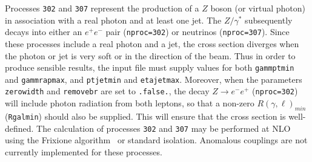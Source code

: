 \label{subsec:zgammajet}
Processes {\tt 302} and {\tt 307} represent the production of a $Z$ boson (or virtual photon)
in association with a real photon and at least one jet.
The $Z/\gamma^*$ subsequently decays into
either an $e^+ e^-$ pair ({\tt nproc=302}) or neutrinos ({\tt nproc=307}).
Since these processes include a real photon and a jet, the cross section diverges
when the photon or jet is very soft or in the direction of the beam.
Thus in order to produce sensible results, the input file must supply values for both
{\tt gammptmin} and {\tt gammrapmax}, and {\tt ptjetmin} and {\tt etajetmax}.
 Moreover, when the parameters {\tt zerowidth}
and {\tt removebr} are set to {\tt .false.}, the decay $Z \to e^- e^+$ ({\tt nproc=302})
will include photon radiation from both leptons, so that a non-zero $R(\gamma,\ell)_{min}$
({\tt Rgalmin})
should also be supplied. This will ensure that the cross section is well-defined.
The calculation of processes {\tt 302} and {\tt 307} may be performed
at NLO using the Frixione algorithm~\cite{Frixione:1998jh} or standard isolation.
Anomalous couplings are not currently implemented for these processes.
